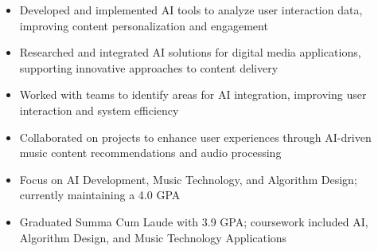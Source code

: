 \par\smallskip
\noindent
\begin{minipage}{20cm}
  \begin{minipage}{9.75cm}
    \begin{itemize}
      \item Developed and implemented AI tools to analyze user interaction data, improving content personalization and engagement
      \item Researched and integrated AI solutions for digital media applications, supporting innovative approaches to content delivery
    \end{itemize}
  \end{minipage}
  \hfill
  \begin{minipage}{9.75cm}
    \begin{itemize}
      \item Worked with teams to identify areas for AI integration, improving user interaction and system efficiency
      \item Collaborated on projects to enhance user experiences through AI-driven music content recommendations and audio processing
    \end{itemize}
  \end{minipage}
\end{minipage}

\begin{itemize}
  \item Focus on AI Development, Music Technology, and Algorithm Design; currently maintaining a 4.0 GPA
\end{itemize}
\divider

\begin{itemize}
  \item Graduated Summa Cum Laude with 3.9 GPA; coursework included AI, Algorithm Design, and Music Technology Applications
\end{itemize}

\noindent
\begin{minipage}{20cm}
      
     
    
\end{minipage}


